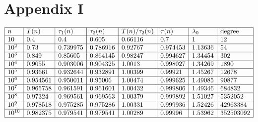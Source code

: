 \documentclass[11pt]{article}
\theoremstyle{definition}
\theoremstyle{remark}
\numberwithin{equation}{section}
\begin{document}
\section{Appendix I}

\begin{table}[h]
$$\begin{array}{|l|l|l|l|l|l|l|l|}
\hline
n & T(n) & \tau_1(n) & \tau_2(n) & T(n)/\tau_2(n) & \tau(n) & \lambda_0 & \text{degree} \\
\hline 
10 &  0.4 & 0.4 & 0.605 & 0.66116 & 0.7 & 1 & 12 \\
\hline
10^2 & 0.73 & 0.739975 & 0.786916 & 0.92767 & 0.974453 & 1.13636 & 54\\
\hline
10^3 & 0.849 & 0.85605 & 0.864145 & 0.98247 & 0.994627 & 1.34454 & 302\\
\hline
10^4 & 0.9055 & 0.903006 & 0.904325 & 1.0013 & 0.998027 & 1.34269 & 1890\\
\hline
10^5 & 0.93661 & 0.932644 & 0.932891 & 1.00399 & 0.99921 & 1.45267 & 12678\\
\hline
10^6 & 0.954561 & 0.950011 & 0.95006 & 1.00474 & 0.999625 & 1.49085 & 90877\\
\hline
10^7 & 0.965758 & 0.961591 & 0.961601 & 1.00432 & 0.999806 & 1.49346 & 684832\\
\hline 
10^8 & 0.97324 & 0.969561 & 0.969563 & 1.00379 & 0.999892 & 1.51027 & 5352052\\
\hline
10^9 & 0.978518 & 0.975285 & 0.975286 & 1.00331 & 0.999936 & 1.52426 & 42963384\\
\hline
10^{10} & 0.982375 & 0.979541 & 0.979541 & 1.00289 & 0.99996 & 1.53962 & 352503092\\
\hline
\end{array}$$
\caption{Values of $T(n)$, $\tau_1(n),\tau_2(n),\tau(n)$, $\lambda_0$ and degree$(x)$ for $x=12n$.}\label{tabtetan0}
\end{table}

\vspace{1em}
\end{document}
